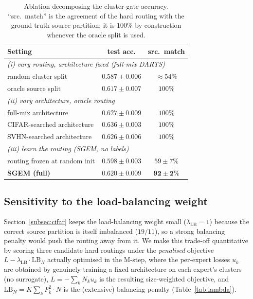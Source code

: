 \begin{table}[h]
\centering
\caption{Ablation decomposing the cluster-gate accuracy. ``src.\ match''
is the agreement of the hard routing with the ground-truth source
partition; it is $100\%$ by construction whenever the oracle split is
used.}
\label{tab:decomp}
\begin{tabular}{lcc}
\toprule
Setting & test acc. & src.\ match \\
\midrule
\multicolumn{3}{l}{\textit{(i) vary routing, architecture fixed (full-mix DARTS)}} \\
\quad random cluster split & $0.587 \pm 0.006$ & $\approx 54\%$ \\
\quad oracle source split & $0.617 \pm 0.007$ & $100\%$ \\
\midrule
\multicolumn{3}{l}{\textit{(ii) vary architecture, oracle routing}} \\
\quad full-mix architecture & $0.627 \pm 0.009$ & $100\%$ \\
\quad CIFAR-searched architecture & $0.636 \pm 0.003$ & $100\%$ \\
\quad SVHN-searched architecture & $0.626 \pm 0.006$ & $100\%$ \\
\midrule
\multicolumn{3}{l}{\textit{(iii) learn the routing (SGEM, no labels)}} \\
\quad routing frozen at random init & $0.598 \pm 0.003$ & $59 \pm 7\%$ \\
\quad \textbf{SGEM (full)} & $\mathbf{0.620 \pm 0.009}$ & $\mathbf{92 \pm 2\%}$ \\
\bottomrule
\end{tabular}
\end{table}

\subsection{Sensitivity to the load-balancing weight}
\label{app:lambda}

Section~\ref{subsec:cifar} keeps the load-balancing weight small
($\lambda_{\text{LB}}=1$) because the correct source partition is itself
imbalanced ($19/11$), so a strong balancing penalty would push the
routing away from it. We make this trade-off quantitative by scoring three
candidate hard routings under the \emph{penalised} objective
$L - \lambda_{\text{LB}}\cdot\mathrm{LB}_N$ actually optimised in the
M-step, where the per-expert losses $u_k$ are obtained by genuinely
training a fixed architecture on each expert's clusters (no surrogate),
$L = -\sum_k N_k u_k$ is the resulting size-weighted objective, and
$\mathrm{LB}_N = K\sum_k P_k^2\cdot N$ is the (extensive) balancing
penalty (Table~\ref{tab:lambda}).

